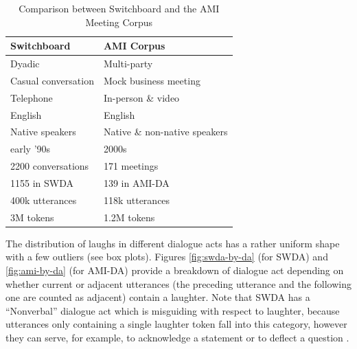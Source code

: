 \documentclass[11pt,a4paper]{article}
\begin{document}

\begin{table}[]
\centering
\begin{tabular}{@{}ll@{}}
\toprule
\textbf{Switchboard}       & \textbf{AMI Corpus}                     \\ \midrule
Dyadic                     & Multi-party                             \\
Casual conversation        & Mock business meeting                   \\
Telephone                  & In-person \& video                      \\ \midrule
English                    & English                                 \\ 
Native speakers            & Native \& non-native speakers           \\ 
early '90s                 & 2000s                                   \\ \midrule
2200 conversations         & 171 meetings                            \\
  \hspace{1em} 1155 in SWDA               & \hspace{1em} 139 in AMI-DA                           \\
400k utterances             & 118k utterances                         \\
3M tokens                  & 1.2M tokens                             \\ \bottomrule
\end{tabular}
  \caption{Comparison between Switchboard and the AMI Meeting Corpus}
  \label{table:corpora}
\end{table}

The distribution of laughs in different dialogue acts has a rather uniform shape with a few outliers (see box plots). Figures \ref{fig:swda-by-da} (for SWDA) and \ref{fig:ami-by-da} (for AMI-DA) provide a breakdown of dialogue act depending on whether current or adjacent utterances (the preceding utterance and the following one are counted as adjacent) contain a laughter. Note that SWDA has a ``Nonverbal'' dialogue act which is misguiding with respect to laughter, because utterances only containing a single laughter token fall into this category, however they can serve, for example, to acknowledge a statement or to deflect a question  \citep{mazzocconi2019phd}.
\end{document}

